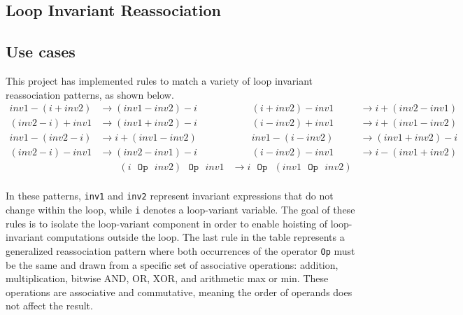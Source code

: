 \subsection{Loop Invariant Reassociation}
\subsection*{Use cases}
This project has implemented rules to match a variety of loop invariant reassociation patterns, as shown below.
\begin{align*}
    inv1 - (i + inv2)          &\rightarrow (inv1 - inv2) - i        &\qquad (i + inv2) - inv1           &\rightarrow i + (inv2 - inv1) \\
    (inv2 - i) + inv1          &\rightarrow (inv1 + inv2) - i        &\qquad (i - inv2) + inv1           &\rightarrow i + (inv1 - inv2) \\
    inv1 - (inv2 - i)          &\rightarrow i + (inv1 - inv2)        &\qquad inv1 - (i - inv2)           &\rightarrow (inv1 + inv2) - i \\
    (inv2 - i) - inv1          &\rightarrow (inv2 - inv1) - i        &\qquad (i - inv2) - inv1           &\rightarrow i - (inv1 + inv2) \\
    &\qquad  (i  \texttt{{\ }Op{\ }} inv2) \texttt{{\ }Op{\ }} inv1         &\rightarrow i \texttt{{\ }Op{\ }} (inv1 \texttt{{\ }Op{\ }} inv2) \\
\end{align*}
\vspace{-10pt}

In these patterns, \texttt{inv1} and \texttt{inv2} represent invariant expressions that do not change within the loop, while \texttt{i} denotes a loop-variant variable. The goal of these rules is to isolate the loop-variant component in order to enable hoisting of loop-invariant computations outside the loop.
The last rule in the table represents a generalized reassociation pattern where both occurrences of the operator \texttt{Op} must be the same and drawn from a specific set of associative operations: addition, multiplication, bitwise AND, OR, XOR, and arithmetic max or min. 
These operations are associative and commutative, meaning the order of operands does not affect the result.

